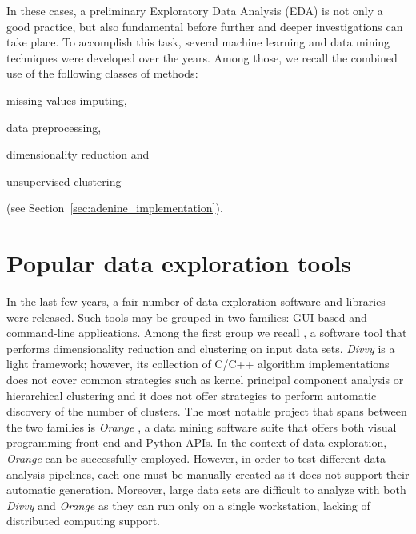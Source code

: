 In these cases, a preliminary Exploratory Data Analysis (\ac{EDA}) is not only a good practice, but also fundamental before further and deeper investigations can take place.
To accomplish this task, several machine learning and data mining techniques were developed over the years.
Among those, we recall the combined use of the following classes of methods: \begin{enumerate*}[label=(\roman*)]
  \item missing values imputing,
  \item data preprocessing,
  \item dimensionality reduction and
  \item unsupervised clustering
\end{enumerate*} (see Section~\ref{sec:adenine_implementation}).


\section{Popular data exploration tools} \label{sec:data_exploration_tools}

In the last few years, a fair number of data exploration software and libraries were released. Such tools may be grouped in two families: \ac{GUI}-based and command-line applications.
Among the first group we recall  \cite{lewis2013divvy}, a software tool that performs dimensionality reduction and clustering on input data sets. \emph{Divvy} is a light framework; however,
its collection of {C/C++} algorithm implementations does not cover common strategies such as kernel principal component analysis \cite{scholkopf1997kernel} or hierarchical clustering \cite{friedman2001elements} and it does not offer strategies to perform automatic discovery of the number of clusters.
The most notable project that spans between the two families is \emph{Orange} \cite{demvsar2013orange}, a data mining software suite that offers both visual programming front-end and Python \ac{API}s. In the context of data exploration, \emph{Orange} can be successfully employed. However, in order to test different data analysis pipelines, each one must be manually created as it does not support their automatic generation.
Moreover, large data sets are difficult to analyze with both \emph{Divvy} and \emph{Orange} as they can run only on a single workstation, lacking of distributed computing support.

